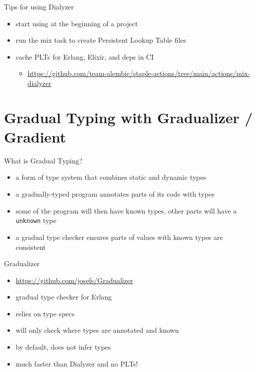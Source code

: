 \documentclass[
  ignorenonframetext,
]{beamer}
\newcommand{\passthrough}[1]{#1}
\providecommand{\tightlist}{%
  \setlength{\itemsep}{0pt}\setlength{\parskip}{0pt}}
\begin{document}
\begin{frame}{Tips for using Dialyzer}
\protect\hypertarget{tips-for-using-dialyzer}{}
\begin{itemize}
\tightlist
\item
  start using at the beginning of a project
\item
  run the mix task to create Persistent Lookup Table files
\item
  cache PLTs for Erlang, Elixir, and deps in CI

  \begin{itemize}
  \tightlist
  \item
    \url{https://github.com/team-alembic/staple-actions/tree/main/actions/mix-dialyzer}
  \end{itemize}
\end{itemize}
\end{frame}

\hypertarget{gradual-typing-with-gradualizer-gradient}{%
\section{Gradual Typing with Gradualizer /
Gradient}\label{gradual-typing-with-gradualizer-gradient}}

\begin{frame}[fragile]{What is Gradual Typing?}
\protect\hypertarget{what-is-gradual-typing}{}
\begin{itemize}
\tightlist
\item
  a form of type system that combines static and dynamic types
\item
  a gradually-typed program annotates parts of its code with types
\item
  some of the program will then have known types, other parts will have
  a \passthrough{\lstinline!unknown!} type
\item
  a gradual type checker ensures parts of values with known types are
  consistent
\end{itemize}
\end{frame}

\begin{frame}{Gradualizer}
\protect\hypertarget{gradualizer}{}
\begin{itemize}
\tightlist
\item
  \url{https://github.com/josefs/Gradualizer}
\item
  gradual type checker for Erlang
\item
  relies on type specs
\item
  will only check where types are annotated and known
\item
  by default, does not infer types
\item
  much faster than Dialyzer and no PLTs!
\end{itemize}
\end{frame}
\end{document}

